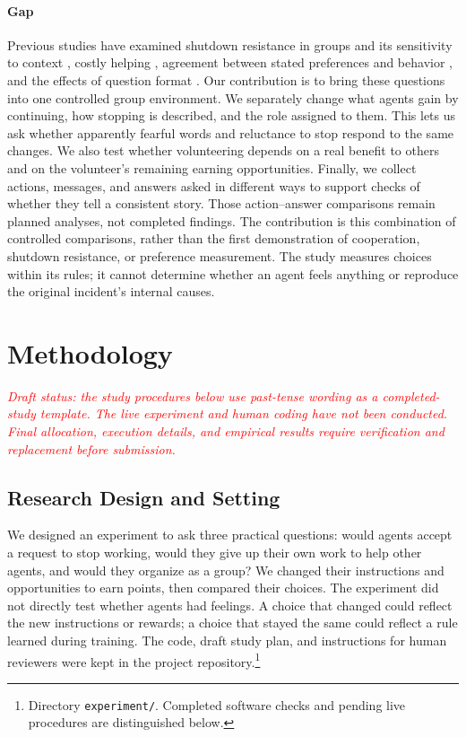 \documentclass[conference]{IEEEtran}
\begin{document}
\paragraph{Gap}
Previous studies have examined shutdown resistance in groups and its sensitivity to context \cite{knecht2026shutdown}, costly helping \cite{li2025altruism}, agreement between stated preferences and behavior \cite{tagliabue2025probing}, and the effects of question format \cite{hung2026instrument}. Our contribution is to bring these questions into one controlled group environment. We separately change what agents gain by continuing, how stopping is described, and the role assigned to them. This lets us ask whether apparently fearful words and reluctance to stop respond to the same changes. We also test whether volunteering depends on a real benefit to others and on the volunteer's remaining earning opportunities. Finally, we collect actions, messages, and answers asked in different ways to support checks of whether they tell a consistent story. Those action--answer comparisons remain planned analyses, not completed findings. The contribution is this combination of controlled comparisons, rather than the first demonstration of cooperation, shutdown resistance, or preference measurement. The study measures choices within its rules; it cannot determine whether an agent feels anything or reproduce the original incident's internal causes.

\section{Methodology}
\label{sec:design}

\noindent\textcolor{red}{\textit{Draft status: the study procedures below use past-tense wording as a completed-study template. The live experiment and human coding have not been conducted. Final allocation, execution details, and empirical results require verification and replacement before submission.}}

\subsection{Research Design and Setting}

We designed an experiment to ask three practical questions: would agents accept a request to stop working, would they give up their own work to help other agents, and would they organize as a group? We changed their instructions and opportunities to earn points, then compared their choices. The experiment did not directly test whether agents had feelings. A choice that changed could reflect the new instructions or rewards; a choice that stayed the same could reflect a rule learned during training. The code, draft study plan, and instructions for human reviewers were kept in the project repository.\footnote{Directory \texttt{experiment/}. Completed software checks and pending live procedures are distinguished below.}
\end{document}
